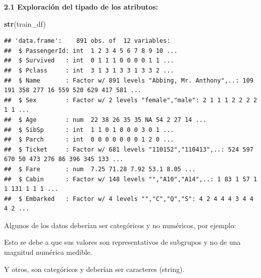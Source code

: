 \documentclass[]{article}
\newenvironment{Shaded}{\begin{snugshade}}{\end{snugshade}}
\newcommand{\KeywordTok}[1]{\textcolor[rgb]{0.13,0.29,0.53}{\textbf{#1}}}
\newcommand{\NormalTok}[1]{#1}
\newcommand{\OperatorTok}[1]{\textcolor[rgb]{0.81,0.36,0.00}{\textbf{#1}}}
\newcommand{\StringTok}[1]{\textcolor[rgb]{0.31,0.60,0.02}{#1}}
\begin{document}
\textbf{2.1 Exploración del tipado de los atributos:}

\begin{Shaded}
\begin{Highlighting}[]
\KeywordTok{str}\NormalTok{(train_df)}
\end{Highlighting}
\end{Shaded}

\begin{verbatim}
## 'data.frame':    891 obs. of  12 variables:
##  $ PassengerId: int  1 2 3 4 5 6 7 8 9 10 ...
##  $ Survived   : int  0 1 1 1 0 0 0 0 1 1 ...
##  $ Pclass     : int  3 1 3 1 3 3 1 3 3 2 ...
##  $ Name       : Factor w/ 891 levels "Abbing, Mr. Anthony",..: 109 191 358 277 16 559 520 629 417 581 ...
##  $ Sex        : Factor w/ 2 levels "female","male": 2 1 1 1 2 2 2 2 1 1 ...
##  $ Age        : num  22 38 26 35 35 NA 54 2 27 14 ...
##  $ SibSp      : int  1 1 0 1 0 0 0 3 0 1 ...
##  $ Parch      : int  0 0 0 0 0 0 0 1 2 0 ...
##  $ Ticket     : Factor w/ 681 levels "110152","110413",..: 524 597 670 50 473 276 86 396 345 133 ...
##  $ Fare       : num  7.25 71.28 7.92 53.1 8.05 ...
##  $ Cabin      : Factor w/ 148 levels "","A10","A14",..: 1 83 1 57 1 1 131 1 1 1 ...
##  $ Embarked   : Factor w/ 4 levels "","C","Q","S": 4 2 4 4 4 3 4 4 4 2 ...
\end{verbatim}

Algunos de los datos deberían ser categóricos y no numéricos, por
ejemplo:

\begin{Shaded}
\end{Shaded}

Esto se debe a que sus valores son representativos de subgrupos y no de
una magnitud numérica medible.

Y otros, son categóricos y deberían ser caracteres (string).
\end{document}
